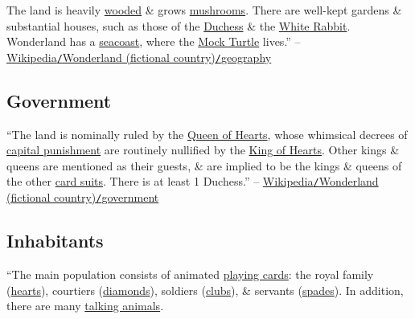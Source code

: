 \documentclass[oneside]{book}
\numberwithin{equation}{section}
\begin{document}
The land is heavily \href{https://en.wikipedia.org/wiki/Woodland}{wooded} \& grows \href{https://en.wikipedia.org/wiki/Mushroom}{mushrooms}. There are well-kept gardens \& substantial houses, such as those of the \href{https://en.wikipedia.org/wiki/Duchess_(Alice%27s_Adventures_in_Wonderland)}{Duchess} \& the \href{https://en.wikipedia.org/wiki/White_Rabbit}{White Rabbit}. Wonderland has a \href{https://en.wikipedia.org/wiki/Coast}{seacoast}, where the \href{https://en.wikipedia.org/wiki/Mock_Turtle}{Mock Turtle} lives.'' -- \href{https://en.wikipedia.org/wiki/Wonderland_(fictional_country)#Geography}{Wikipedia\texttt{/}Wonderland (fictional country)\texttt{/}geography}

\subsection{Government}
``The land is nominally ruled by the \href{https://en.wikipedia.org/wiki/Queen_of_Hearts_(Alice%27s_Adventures_in_Wonderland)}{Queen of Hearts}, whose whimsical decrees of \href{https://en.wikipedia.org/wiki/Capital_punishment}{capital punishment} are routinely nullified by the \href{https://en.wikipedia.org/wiki/King_of_Hearts_(Alice%27s_Adventures_in_Wonderland)}{King of Hearts}. Other kings \& queens are mentioned as their guests, \& are implied to be the kings \& queens of the other \href{https://en.wikipedia.org/wiki/Playing_card_suit}{card suits}. There is at least 1 Duchess.'' -- \href{https://en.wikipedia.org/wiki/Wonderland_(fictional_country)#Government}{Wikipedia\texttt{/}Wonderland (fictional country)\texttt{/}government}

\subsection{Inhabitants}
``The main population consists of animated \href{https://en.wikipedia.org/wiki/Playing_cards}{playing cards}: the royal family (\href{https://en.wikipedia.org/wiki/Hearts_(suit)}{hearts}), courtiers (\href{https://en.wikipedia.org/wiki/Diamonds_(suit)}{diamonds}), soldiers (\href{https://en.wikipedia.org/wiki/Clubs_(suit)}{clubs}), \& servants (\href{https://en.wikipedia.org/wiki/Spades_(suit)}{spades}). In addition, there are many \href{https://en.wikipedia.org/wiki/Talking_animals_in_fiction}{talking animals}.
\end{document}
